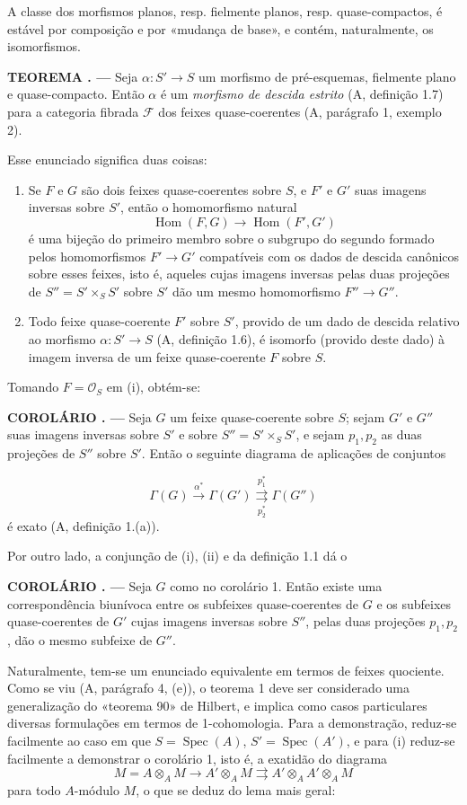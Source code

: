 \documentclass[11pt,twoside,openany]{book}
\numberwithin{equation}{section}
\newcommand{\src}[1]{%
  \phantomsection\hypertarget{src:#1}{}%
  \marginpar{\raggedleft\footnotesize\sffamily #1}%
}
\theoremstyle{plain}
\theoremstyle{definition}
\theoremstyle{remark}
\newcommand{\result}[2]{%
  \par\medskip\noindent\textbf{#1%
  \if\relax\detokenize{#2}\relax\else\space#2\fi. ---}\enspace
}
\newcommand{\FgaUnitKey}{frontmatter}
\renewcommand{\src}[1]{%
  \phantomsection\hypertarget{src:\FgaUnitKey:#1}{}%
  \marginpar{\raggedleft\footnotesize\sffamily #1}%
}
\begin{document}
A classe dos morfismos planos, resp. fielmente planos, resp. quase-compactos,
é estável por composição e por «mudança de base», e contém, naturalmente,
os isomorfismos.

\result{TEOREMA}{1} Seja $\alpha:S'\longrightarrow S$ um morfismo de
pré-esquemas, fielmente plano e quase-compacto. Então $\alpha$ é um
\emph{morfismo de descida estrito} (A, definição 1.7) para a categoria
fibrada $\mathcal F$ dos feixes quase-coerentes (A, parágrafo 1, exemplo 2).

Esse enunciado significa duas coisas:
\begin{enumerate}
\item[(i)] Se $F$ e $G$ são dois feixes quase-coerentes sobre $S$, e $F'$ e
$G'$ suas imagens inversas sobre $S'$, então o homomorfismo natural
\[
  \operatorname{Hom}(F,G)\longrightarrow\operatorname{Hom}(F',G')
\]
é uma bijeção do primeiro membro sobre o subgrupo do segundo formado pelos
homomorfismos $F'\longrightarrow G'$ compatíveis com os dados de descida
canônicos sobre esses feixes, isto é, aqueles cujas imagens inversas pelas
duas projeções de $S''=S'\times_SS'$ sobre $S'$ dão um mesmo
homomorfismo $F''\longrightarrow G''$.
\item[(ii)] Todo feixe quase-coerente $F'$ sobre $S'$, provido de um dado de
descida relativo ao morfismo $\alpha:S'\longrightarrow S$
(A, definição 1.6), é isomorfo (provido deste dado) à imagem inversa de
um feixe quase-coerente $F$ sobre $S$.
\end{enumerate}
Tomando $F=\mathcal O_S$ em (i), obtém-se:

\result{COROLÁRIO}{1} Seja $G$ um feixe quase-coerente sobre $S$; sejam
$G'$ e $G''$ suas imagens inversas sobre $S'$ e sobre
$S''=S'\times_SS'$, e sejam $p_1,p_2$ as duas projeções de $S''$ sobre
$S'$. Então o seguinte diagrama de aplicações de conjuntos

\src{316}
\[
  \Gamma(G)\xrightarrow{\alpha^*}\Gamma(G')
  \underset{p_2^*}{\overset{p_1^*}{\rightrightarrows}}\Gamma(G'')
\]
é exato (A, definição 1.(a)).

Por outro lado, a conjunção de (i), (ii) e da definição 1.1 dá o

\result{COROLÁRIO}{2} Seja $G$ como no corolário 1. Então existe uma
correspondência biunívoca entre os subfeixes quase-coerentes de $G$ e os
subfeixes quase-coerentes de $G'$ cujas imagens inversas sobre $S''$, pelas
duas projeções $p_1,p_2$, dão o mesmo subfeixe de $G''$.

Naturalmente, tem-se um enunciado equivalente em termos de feixes quociente.
Como se viu (A, parágrafo 4, (e)), o teorema 1 deve ser considerado uma
generalização do «teorema 90» de Hilbert, e implica como casos particulares
diversas formulações em termos de 1-cohomologia. Para a demonstração, reduz-se
facilmente ao caso em que $S=\operatorname{Spec}(A)$,
$S'=\operatorname{Spec}(A')$, e para (i) reduz-se facilmente a demonstrar o
corolário 1, isto é, a exatidão do diagrama
\[
  M=A\otimes_A M\longrightarrow A'\otimes_A M
  \rightrightarrows A'\otimes_AA'\otimes_A M
\]
para todo $A$-módulo $M$, o que se deduz do lema mais geral:
\end{document}
